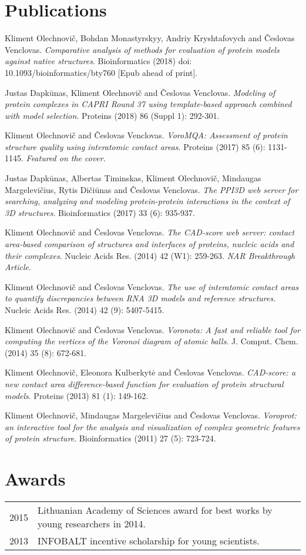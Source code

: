 \documentclass{article}
\newenvironment{enumerate_tight}{
\begin{enumerate}
  \setlength{\itemsep}{2pt}
  \setlength{\parskip}{0pt}
  \setlength{\parsep}{0pt}
}{\end{enumerate}}
\begin{document}
\section*{Publications}
\begin{enumerate_tight}
  \item Kliment Olechnovi\v{c}, Bohdan Monastyrskyy, Andriy Kryshtafovych and \v{C}eslovas Venclovas.
        \emph{Comparative analysis of methods for evaluation of protein models against native structures}.
        Bioinformatics (2018) doi: 10.1093/bioinformatics/bty760 [Epub ahead of print].
  \item Justas Dapk\={u}nas, Kliment Olechnovi\v{c} and \v{C}eslovas Venclovas.
        \emph{Modeling of protein complexes in CAPRI Round 37 using template-based approach combined with model selection}.
        Proteins (2018) 86 (Suppl 1): 292-301.
  \item Kliment Olechnovi\v{c} and \v{C}eslovas Venclovas.
        \emph{VoroMQA: Assessment of protein structure quality using interatomic contact areas}.
        Proteins (2017) 85 (6): 1131-1145. \emph{Featured on the cover}.
  \item Justas Dapk\={u}nas, Albertas Timinskas, Kliment Olechnovi\v{c}, Mindaugas Margelevi\v{c}ius, Rytis Di\v{c}i\={u}nas and \v{C}eslovas Venclovas.
        \emph{The PPI3D web server for searching, analyzing and modeling protein-protein interactions in the context of 3D structures}.
        Bioinformatics (2017) 33 (6): 935-937.
  \item Kliment Olechnovi\v{c} and \v{C}eslovas Venclovas.
        \emph{The CAD-score web server: contact area-based comparison of structures and interfaces of proteins, nucleic acids and their complexes}.
        Nucleic Acids Res. (2014) 42 (W1): 259-263. \emph{NAR Breakthrough Article}.
  \item Kliment Olechnovi\v{c} and \v{C}eslovas Venclovas.
        \emph{The use of interatomic contact areas to quantify discrepancies between RNA 3D models and reference structures}.
        Nucleic Acids Res. (2014) 42 (9): 5407-5415.
  \item Kliment Olechnovi\v{c} and \v{C}eslovas Venclovas.
        \emph{Voronota: A fast and reliable tool for computing the vertices of the Voronoi diagram of atomic balls}.
        J. Comput. Chem. (2014) 35 (8): 672-681.
  \item Kliment Olechnovi\v{c}, Eleonora Kulberkyt\.{e} and \v{C}eslovas Venclovas.
        \emph{CAD-score: a new contact area difference-based function for evaluation of protein structural models}.
        Proteins (2013) 81 (1): 149-162.
  \item Kliment Olechnovi\v{c}, Mindaugas Margelevi\v{c}ius and \v{C}eslovas Venclovas.
        \emph{Voroprot: an interactive tool for the analysis and visualization of complex geometric features of protein structure}.
        Bioinformatics (2011) 27 (5): 723-724.
\end{enumerate_tight}


\section*{Awards}
\begin{tabular}{p{}p{}}
2015 & Lithuanian Academy of Sciences award for best works by young researchers in 2014. \\
2013 & INFOBALT incentive scholarship for young scientists.
\end{tabular}
\end{document}
